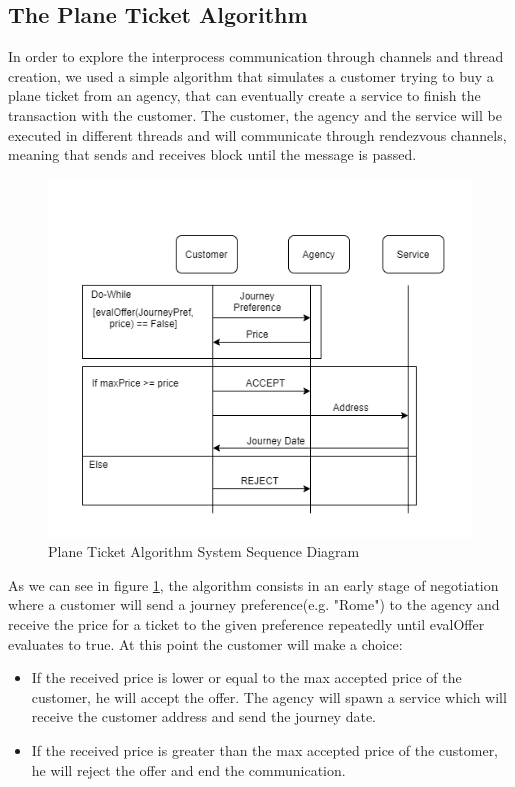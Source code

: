\documentclass[runningheads]{llncs}
\begin{document}
\subsection{The Plane Ticket Algorithm}
\label{alg}
In order to explore the interprocess communication through channels and thread creation, we used a simple algorithm that simulates a customer trying to buy a plane ticket from an agency, that can eventually create a service to finish the transaction with the customer. The customer, the agency and the service will be executed in different threads and will communicate through rendezvous channels, meaning that sends and receives block until the message is passed.
\begin{figure}[H]
\centering
\includegraphics[scale=0.4]{Algorithm.png}
\caption{Plane Ticket Algorithm System Sequence Diagram}
\label{ssd}
\end{figure}
As we can see in figure \ref{ssd}, the algorithm consists in an early stage of negotiation where a customer will send a journey preference(e.g. "Rome") to the agency and receive the price for a ticket to the given preference repeatedly until evalOffer evaluates to true.
At this point the customer will make a choice:
\begin{itemize}
\item If the received price is lower or equal to the max accepted price of the customer, he will accept the offer.
The agency will spawn a service which will receive the customer address and send the journey date.
\item If the received price is greater than the max accepted price of the customer, he will reject the offer and end the communication.
\end{itemize}
\end{document}
